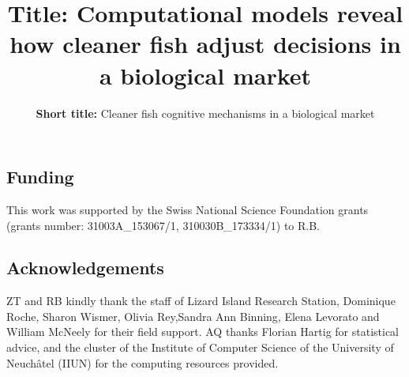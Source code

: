 \documentclass[
]{article}
\title{\large \textbf{Title:} Computational models reveal how cleaner
fish adjust decisions in a biological market}
\subtitle{\normalsize \textbf{Short title:} Cleaner fish cognitive
mechanisms in a biological market}
\date{}
\newcommand{\getIndex}[2]{
  \ForEach{,}{\IfEq{#1}{\thislevelitem}{\number\thislevelcount\ExitForEach}{}}{#2}
}
\newcommand{\getAff}[1]{
  \getIndex{#1}{a,b}
}
\begin{document}
\maketitle
{}

\hypertarget{funding}{%
\subsection{Funding}\label{funding}}

This work was supported by the Swiss National Science Foundation grants
(grants number: 31003A\_153067/1, 310030B\_173334/1) to R.B.

\hypertarget{acknowledgements}{%
\subsection{Acknowledgements}\label{acknowledgements}}

ZT and RB kindly thank the staff of Lizard Island Research Station,
Dominique Roche, Sharon Wismer, Olivia Rey,Sandra Ann Binning, Elena
Levorato and William McNeely for their field support. AQ thanks Florian
Hartig for statistical advice, and the cluster of the Institute of
Computer Science of the University of Neuchâtel (IIUN) for the computing
resources provided.
\end{document}

